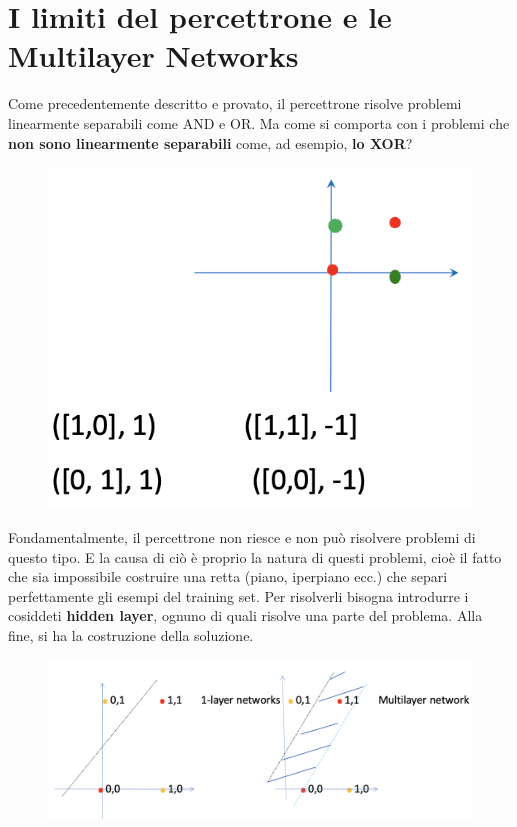 \section{I limiti del percettrone e le Multilayer Networks}
Come precedentemente descritto e provato, il percettrone risolve problemi linearmente separabili come AND e OR. Ma come si comporta con i problemi che \textbf{non sono linearmente separabili} come, ad esempio, \textbf{lo XOR}?
\begin{figure}[!h]
    \includegraphics[scale=.8]{images/perceptron/xor.png}
    \centering
\end{figure}



Fondamentalmente, il percettrone non riesce e non può risolvere problemi di questo tipo. E la causa di ciò è proprio la natura di questi problemi, cioè il fatto che sia impossibile costruire una retta (piano, iperpiano ecc.) che separi perfettamente gli esempi del training set.\newline
Per risolverli bisogna introdurre i cosiddeti \textbf{hidden layer}, ognuno di quali risolve una parte del problema. Alla fine, si ha la costruzione della soluzione.
\begin{figure}[!h]
    \includegraphics[scale=.75]{images/perceptron/multilayerNet.png}
    \centering
\end{figure}
\newpage

